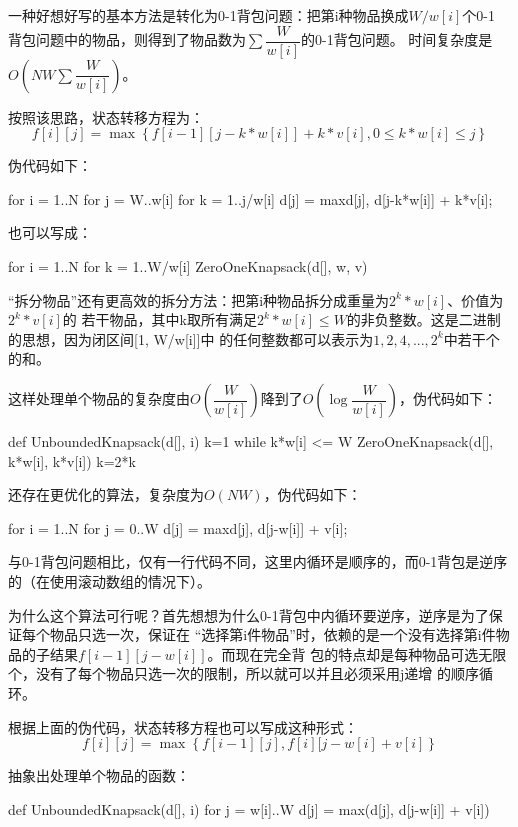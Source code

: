 一种好想好写的基本方法是转化为0-1背包问题：把第i种物品换成$W/w[i]$个0-1
背包问题中的物品，则得到了物品数为$\sum \dfrac{W}{w[i]}$的0-1背包问题。
时间复杂度是$O(NW\sum \dfrac{W}{w[i]})$。

按照该思路，状态转移方程为：
$$f[i][j]=\max\left\{f[i-1][j-k*w[i]]+k*v[i], 0 \leq k*w[i] \leq j\right\}$$

伪代码如下：
\begin{Code}
for i = 1..N
    for j = W..w[i]
        for k = 1..j/w[i]
            d[j] = max{d[j], d[j-k*w[i]] + k*v[i]};
\end{Code}

也可以写成：
\begin{Code}
for i = 1..N
    for k = 1..W/w[i]
        ZeroOneKnapsack(d[], w, v)
\end{Code}

“拆分物品”还有更高效的拆分方法：把第i种物品拆分成重量为$2^k*w[i]$、价值为$2^k*v[i]$的
若干物品，其中k取所有满足$2^k*w[i] \leq W$的非负整数。这是二进制的思想，因为闭区间[1, W/w[i]]中
的任何整数都可以表示为$1, 2, 4, ..., 2^k$中若干个的和。

这样处理单个物品的复杂度由$O\left(\dfrac{W}{w[i]}\right)$降到了$O\left(\log \dfrac{W}{w[i]}\right)$，伪代码如下：
\begin{Code}
def UnboundedKnapsack(d[], i)
    k=1
    while k*w[i] <= W
        ZeroOneKnapsack(d[], k*w[i], k*v[i])
        k=2*k
\end{Code}

还存在更优化的算法，复杂度为$O(NW)$，伪代码如下：
\begin{Code}
for i = 1..N
    for j = 0..W
        d[j] = max{d[j], d[j-w[i]] + v[i]};
\end{Code}

与0-1背包问题相比，仅有一行代码不同，这里内循环是顺序的，而0-1背包是逆序的（在使用滚动数组的情况下）。

为什么这个算法可行呢？首先想想为什么0-1背包中内循环要逆序，逆序是为了保证每个物品只选一次，保证在
“选择第i件物品”时，依赖的是一个没有选择第i件物品的子结果$f[i-1][j-w[i]]$。而现在完全背
包的特点却是每种物品可选无限个，没有了每个物品只选一次的限制，所以就可以并且必须采用j递增
的顺序循环。

根据上面的伪代码，状态转移方程也可以写成这种形式：
$$f[i][j]=\max\left\{f[i-1][j], f[i][j-w[i]+v[i]\right\}$$

抽象出处理单个物品的函数：
\begin{Code}
def UnboundedKnapsack(d[], i)
    for j = w[i]..W
        d[j] = max(d[j], d[j-w[i]] + v[i])
\end{Code}

